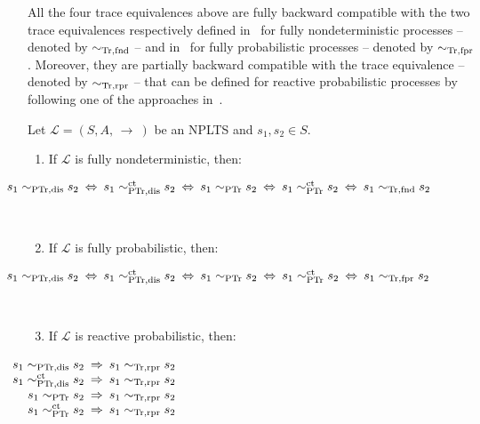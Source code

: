 \documentclass{LMCS}
\newcommand{\cws}[2]
	{\\ \centerline{$#2$} \\[-#1pt]}
\newcommand{\call}
        {\mathcal{L}}
\newcommand{\arrow}[2]
        {\, {\auxarrow\limits^{#1}}_{#2} \,}
\newcommand{\auxarrow}
{\mathop{\longrightarrow}}
\newcommand{\sbis}[1]
	{\sim_{#1}}
\begin{document}
All the four trace equivalences above are fully backward compatible with the two trace equivalences
respectively defined in~\cite{BHR84} for fully nondeterministic processes -- denoted by $\sbis{\rm Tr,fnd}$
-- and in~\cite{JS90} for fully probabilistic processes -- denoted by $\sbis{\rm Tr,fpr}$. Moreover, they
are partially backward compatible with the trace equivalence -- denoted by $\sbis{\rm Tr,rpr}$ -- that can
be defined for reactive probabilistic processes by following one of the approaches in~\cite{Sei95}.

	\begin{thm}\label{thm:trace_compat}

Let $\call = (S, A, \! \arrow{}{} \!)$ be an NPLTS and $s_{1}, s_{2} \in S$.

		\begin{enumerate}

\item If $\call$ is fully nondeterministic, then:
\cws{10}{\hspace*{-1.2cm} s_{1} \sbis{\rm PTr,dis} s_{2} \: \Leftrightarrow \: s_{1} \sbis{\rm PTr,dis}^{\rm
ct} s_{2} \: \Leftrightarrow \: s_{1} \sbis{\rm PTr} s_{2} \: \Leftrightarrow \: s_{1} \sbis{\rm PTr}^{\rm
ct} s_{2} \: \Leftrightarrow \: s_{1} \sbis{\rm Tr,fnd} s_{2}}

\item If $\call$ is fully probabilistic, then:
\cws{10}{\hspace*{-1.2cm} s_{1} \sbis{\rm PTr,dis} s_{2} \: \Leftrightarrow \: s_{1} \sbis{\rm PTr,dis}^{\rm
ct} s_{2} \: \Leftrightarrow \: s_{1} \sbis{\rm PTr} s_{2} \: \Leftrightarrow \: s_{1} \sbis{\rm PTr}^{\rm
ct} s_{2} \: \Leftrightarrow \: s_{1} \sbis{\rm Tr,fpr} s_{2}}

\item If $\call$ is reactive probabilistic, then:
\cws{10}{\hspace*{-1.2cm}\begin{array}{rcl}
s_{1} \sbis{\rm PTr,dis} s_{2} & \!\!\! \Rightarrow \!\!\! & s_{1} \sbis{\rm Tr,rpr} s_{2} \\
s_{1} \sbis{\rm PTr,dis}^{\rm ct} s_{2} & \!\!\! \Rightarrow \!\!\! & s_{1} \sbis{\rm Tr,rpr} s_{2} \\
s_{1} \sbis{\rm PTr} s_{2} & \!\!\! \Rightarrow \!\!\! & s_{1} \sbis{\rm Tr,rpr} s_{2} \\
s_{1} \sbis{\rm PTr}^{\rm ct} s_{2} & \!\!\! \Rightarrow \!\!\! & s_{1} \sbis{\rm Tr,rpr} s_{2} \\
\end{array}}


\end{enumerate}
\end{thm}
\end{document}

